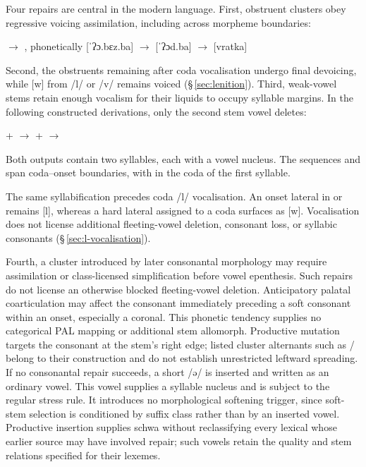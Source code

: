 Four repairs are central in the modern language. First, obstruent clusters obey
regressive voicing assimilation, including across morpheme boundaries:

\pex
\a {} $\rightarrow$ , phonetically [ˈʔɔ.bɛz.ba]
\a {} $\rightarrow$ [ˈʔɔd.ba]
\a {} $\rightarrow$ [vratka]
\xe

Second, the obstruents remaining after coda vocalisation undergo final
devoicing, while [w] from /l/ or /v/ remains voiced
(§\,\ref{sec:lenition}). Third, weak-vowel stems retain enough
vocalism for their liquids to occupy syllable margins. In the following
constructed derivations, only the second stem vowel deletes:

\pex
\a {} +  $\rightarrow$ 
\a {} +  $\rightarrow$ 
\xe

Both outputs contain two syllables, each with a vowel nucleus. The sequences
 and  span coda--onset boundaries, with  in the coda
of the first syllable.

The same syllabification precedes coda /l/ vocalisation. An onset lateral
in  or  remains [l], whereas a hard lateral assigned
to a coda surfaces as [w]. Vocalisation does not license additional fleeting-vowel
deletion, consonant loss, or syllabic consonants
(§\,\ref{sec:l-vocalisation}).

Fourth, a cluster introduced by later consonantal morphology may require
assimilation or class-licensed simplification before vowel epenthesis. Such
repairs do not license an otherwise blocked fleeting-vowel deletion.
Anticipatory palatal coarticulation may affect the consonant immediately
preceding a soft consonant within an onset, especially a coronal. This
phonetic tendency supplies no categorical PAL mapping or additional stem
allomorph. Productive mutation targets the consonant at the stem's right
edge; listed cluster alternants such as /
belong to their construction and do not establish unrestricted leftward
spreading. If no consonantal repair succeeds, a short
 /ə/ is inserted and written as an ordinary vowel. This vowel supplies
a syllable nucleus and is subject to the regular stress rule. It introduces no
morphological softening trigger, since soft-stem selection is conditioned by
suffix class rather than by an inserted vowel. Productive insertion supplies
schwa without reclassifying every lexical  whose earlier source
may have involved repair; such vowels retain the quality and stem relations
specified for their lexemes.

